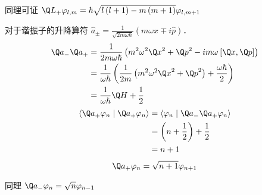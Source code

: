 同理可证 ${\Q L_ + }{\varphi _{l,m}} = \hbar \sqrt {l\left( {l + 1} \right) - m\left( {m + 1} \right)} {\varphi _{l,m + 1}}$ 


对于谐振子的升降算符 ${\hat a_ \pm } = \frac{1}{{\sqrt {2m\omega \hbar } }}\left( {m\omega \hat x \mp i\hat p} \right)$．   
 \begin{equation}
  \begin{aligned}
  {{\Q a}_ - }{{\Q a}_ + } &= \frac{1}{{2m\omega \hbar }}\left( {{m^2}{\omega ^2}{{\Q x}^2} + {{\Q p}^2} - im\omega {\kern 1pt} {\kern 1pt} [\Q x,\Q p]} \right) \hfill \\
   &= \frac{1}{{\omega \hbar }}\left( {\frac{1}{{2m}}\left( {{m^2}{\omega ^2}{{\Q x}^2} + {{\Q p}^2}} \right) + \frac{{\omega \hbar }}{2}} \right) \hfill \\
  & = \frac{1}{{\omega \hbar }}\Q H + \frac{1}{2} \hfill \\ 
\end{aligned} 
\end{equation}
 \begin{equation}
  \begin{aligned}
  \left\langle {{{{\Q a}_ + }{\varphi _n}}}
 \mathrel{\left | {\vphantom {{{{\Q a}_ + }{\varphi _n}} {{{\Q a}_ + }{\varphi _n}}}}
 \right. \kern-\nulldelimiterspace}
 {{{{\Q a}_ + }{\varphi _n}}} \right\rangle  &= \left\langle {{{\varphi _n}}}
 \mathrel{\left | {\vphantom {{{\varphi _n}} {{{\Q a}_ - }{{\Q a}_ + }{\varphi _n}}}}
 \right. \kern-\nulldelimiterspace}
 {{{{\Q a}_ - }{{\Q a}_ + }{\varphi _n}}} \right\rangle  \hfill \\
  & = \left( {n + \frac{1}{2}} \right) + \frac{1}{2} \\
  &= n + 1 \hfill \\ 
\end{aligned} 
\end{equation}
\begin{equation}
  {\Q a_ + }{\varphi _n} = \sqrt {n + 1} {\varphi _{n + 1}}
\end{equation}
 
同理 ${\Q a_ - }{\varphi _n} = \sqrt n {\varphi _{n - 1}}$   

